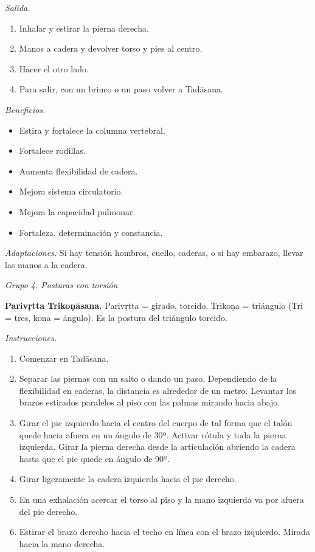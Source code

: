 \emph{Salida.}
\begin{enumerate}
\item Inhalar y estirar la pierna derecha.
\item Manos a cadera y devolver torso y pies
al centro.
\item Hacer el otro lado.
\item Para salir, con un brinco o un paso
volver a Tadāsana.
\end{enumerate}

\emph{Beneficios.}
\begin{itemize}
\item Estira y fortalece la columna
vertebral.
\item Fortalece rodillas.
\item Aumenta flexibilidad de cadera.
\item Mejora sistema circulatorio.
\item Mejora la capacidad pulmonar.
\item Fortaleza, determinación y constancia.
\end{itemize}

\emph{Adaptaciones.} Si hay tensión hombros,
cuello, caderas, o si hay embarazo, llevar
las manos a la cadera.

\medskip\noindent\emph{Grupo 4. Posturas con
torsión}

\medskip\noindent\textbf{Parivṛtta
Trikoṇāsana.}
Parivṛtta = girado, torcido. Trikoṇa =
triángulo (Tri = tres, kona = ángulo). Es la
postura del triángulo torcido.

\emph{Instrucciones.}
\begin{enumerate}
\item Comenzar en Tadāsana.
\item Separar las piernas con un salto o
dando un paso. Dependiendo de la flexibilidad
en caderas, la distancia es alrededor de un
metro. Levantar los brazos estirados
paralelos al piso con las palmas mirando
hacia abajo.
\item Girar el pie izquierdo hacia el centro
del cuerpo de tal forma que el talón quede
hacia afuera en un ángulo de 30º. Activar
rótula y toda la pierna izquierda. Girar la
pierna derecha desde la articulación abriendo
la cadera hasta que el pie quede en ángulo de
90º.
\item Girar ligeramente la
cadera izquierda hacia el pie derecho.
\item En una exhalación acercar el torso al
piso y la mano izquierda va por afuera del
pie derecho.
\item Estirar el brazo derecho hacia el techo
en línea con el brazo izquierdo. Mirada hacia
la mano derecha.
\end{enumerate}

